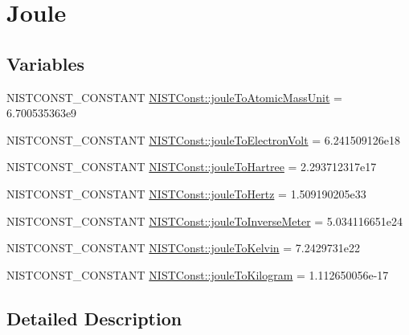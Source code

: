 \hypertarget{group___n_i_s_t_const-_joule}{}\section{Joule}
\label{group___n_i_s_t_const-_joule}
\subsection*{Variables}
\begin{DoxyCompactItemize}
\item 
N\+I\+S\+T\+C\+O\+N\+S\+T\+\_\+\+C\+O\+N\+S\+T\+A\+NT \mbox{\hyperlink{group___n_i_s_t_const-_joule_ga7e8cccc6b8aca9292bdaba28d92d0cc3}{N\+I\+S\+T\+Const\+::joule\+To\+Atomic\+Mass\+Unit}} = 6.\+700535363e9
\item 
N\+I\+S\+T\+C\+O\+N\+S\+T\+\_\+\+C\+O\+N\+S\+T\+A\+NT \mbox{\hyperlink{group___n_i_s_t_const-_joule_ga8a25948c1c135438783f418f669a9af6}{N\+I\+S\+T\+Const\+::joule\+To\+Electron\+Volt}} = 6.\+241509126e18
\item 
N\+I\+S\+T\+C\+O\+N\+S\+T\+\_\+\+C\+O\+N\+S\+T\+A\+NT \mbox{\hyperlink{group___n_i_s_t_const-_joule_ga7a39b3d73c8112638347f756bc80f2d0}{N\+I\+S\+T\+Const\+::joule\+To\+Hartree}} = 2.\+293712317e17
\item 
N\+I\+S\+T\+C\+O\+N\+S\+T\+\_\+\+C\+O\+N\+S\+T\+A\+NT \mbox{\hyperlink{group___n_i_s_t_const-_joule_ga3ad1c9580561eb98c449db137ef09d40}{N\+I\+S\+T\+Const\+::joule\+To\+Hertz}} = 1.\+509190205e33
\item 
N\+I\+S\+T\+C\+O\+N\+S\+T\+\_\+\+C\+O\+N\+S\+T\+A\+NT \mbox{\hyperlink{group___n_i_s_t_const-_joule_gaf31dbc48b766c4fe5d70ddb485253be8}{N\+I\+S\+T\+Const\+::joule\+To\+Inverse\+Meter}} = 5.\+034116651e24
\item 
N\+I\+S\+T\+C\+O\+N\+S\+T\+\_\+\+C\+O\+N\+S\+T\+A\+NT \mbox{\hyperlink{group___n_i_s_t_const-_joule_gabba35f3a458ac8488e06a1ec82b98a06}{N\+I\+S\+T\+Const\+::joule\+To\+Kelvin}} = 7.\+2429731e22
\item 
N\+I\+S\+T\+C\+O\+N\+S\+T\+\_\+\+C\+O\+N\+S\+T\+A\+NT \mbox{\hyperlink{group___n_i_s_t_const-_joule_ga94f11f25f1efe95fef2594b97366c81e}{N\+I\+S\+T\+Const\+::joule\+To\+Kilogram}} = 1.\+112650056e-\/17
\end{DoxyCompactItemize}


\subsection{Detailed Description}



